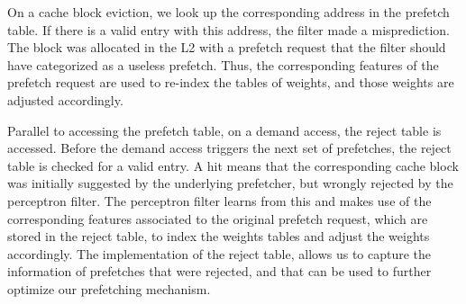 On a cache block eviction, we look up the corresponding address in the
prefetch table. If there is a valid entry with this address, the
filter made a misprediction. The block was allocated in the L2 with a
prefetch request that the filter should have categorized as a useless
prefetch. Thus, the corresponding features of the prefetch request are
used to re-index the tables of weights, and those weights are adjusted
accordingly.


Parallel to accessing the prefetch table, on a demand access, the
reject table is accessed. Before the demand access triggers the next
set of prefetches, the reject table is checked for a valid entry. A
hit means that the corresponding cache block was initially suggested
by the {\color{red}underlying} prefetcher, but wrongly rejected by the perceptron
filter. The perceptron filter learns from this and makes use of the
corresponding features associated to the original prefetch request,
which are stored in the reject table, to index the weights tables and
adjust the weights accordingly.
The implementation of the reject table, allows us to capture the 
information of prefetches that were rejected, and that can be used 
to further optimize our prefetching mechanism.
%

